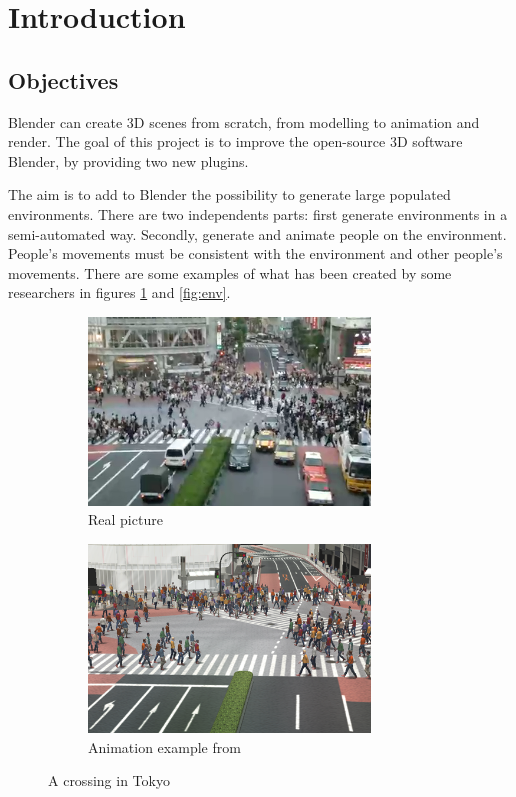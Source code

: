 \section{Introduction}

\subsection{Objectives}

Blender can create 3D scenes from scratch, from modelling to animation
and render. The goal of this project is to improve the open-source 3D
software Blender, by providing two new plugins.

The aim is to add to Blender the possibility to generate large
populated environments. There are two independents parts: first
generate environments in a semi-automated way. Secondly, generate and
animate people on the environment. People's movements must be consistent
with the environment and other people's movements. There are some
examples of what has been created by some researchers in figures
\ref{fig:crowd} and \ref{fig:env}.

\begin{figure}[h] \centering

  \begin{subfigure}[t]{0.5\textwidth}
    \includegraphics[width=7.5cm]{img/PLE_real.png}
    \caption{Real picture}
  \end{subfigure}%
  \begin{subfigure}[t]{0.5\textwidth}
    \includegraphics[width=7.5cm]{img/PLE_simu.png}
    \caption{Animation example from \cite{PLE}}
  \end{subfigure}
  \caption{A crossing in Tokyo}
  \label{fig:crowd}
\end{figure}


